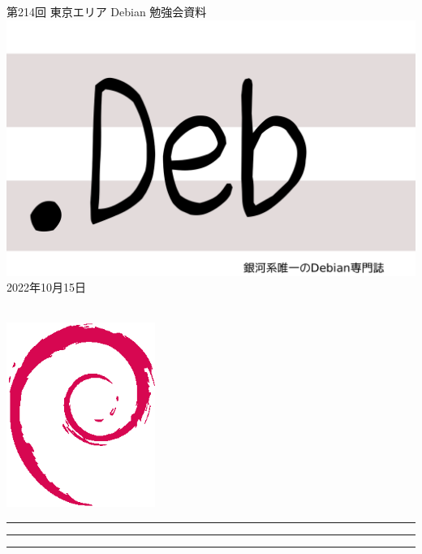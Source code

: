 \documentclass[mingoth,a4paper]{jsarticle}
\newcommand{\debmtgyear}{2022}
\newcommand{\debmtgmonth}{10}
\newcommand{\debmtgdate}{15}
\newcommand{\debmtgnumber}{214}
\begin{document}
\begin{titlepage}
\thispagestyle{empty}

\vspace*{-2cm}
第\debmtgnumber{}回 東京エリア Debian 勉強会資料\\
\hspace*{-2cm}
\includegraphics{image-assets/dotdeb.pdf}\\
\hfill{}\debmtgyear{}年\debmtgmonth{}月\debmtgdate{}日

\\

\vspace*{-2cm}
\hfill{}\includegraphics[height=6cm]{image-assets/openlogo-nd.eps}
\end{titlepage}

\newpage

\begin{minipage}[b]{0.2\hsize}
 \colorbox{titleback}{}
\end{minipage}
\begin{minipage}[b]{0.8\hsize}
\hrule
\vspace{2mm}
\hrule
\begin{multicols}{2}
\tableofcontents
\end{multicols}
\vspace{2mm}
\hrule
\end{minipage}
\end{document}
